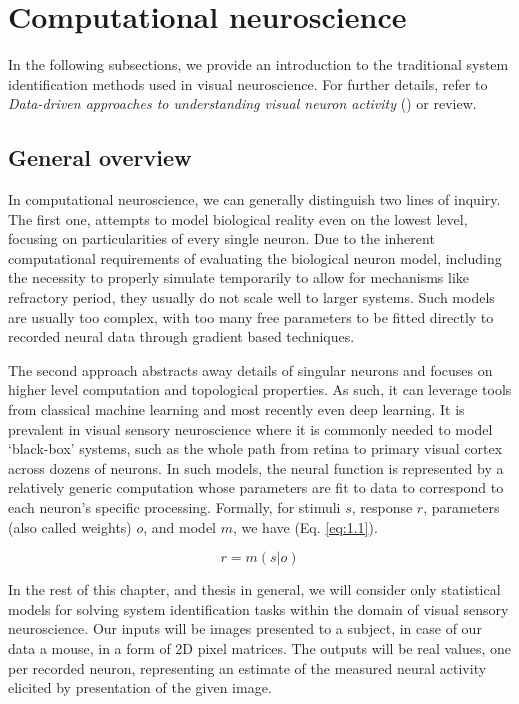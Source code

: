 \section{Computational neuroscience}

In the following subsections, we provide an introduction to the traditional system identification methods used in visual neuroscience. For further details, refer to \textit{Data-driven approaches to understanding visual neuron activity} (\cite{doi:10.1146/annurev-vision-091718-014731}) or \cite{Carandini10577} review.

\subsection{General overview}

In computational neuroscience, we can generally distinguish two lines of inquiry. The first one, attempts to model biological reality even on the lowest level, focusing on particularities of every single neuron. Due to the inherent computational requirements of evaluating the biological neuron model, including the necessity to properly simulate temporarily to allow for mechanisms like refractory period, they usually do not scale well to larger systems. Such models are usually too complex, with too many free parameters to be fitted directly to recorded neural data through gradient based techniques. 

The second approach abstracts away details of singular neurons and focuses on higher level computation and topological properties. As such, it can leverage tools from classical machine learning and most recently even deep learning. It is prevalent in visual sensory neuroscience where it is commonly needed to model ‘black-box’ systems, such as the whole path from retina to primary visual cortex across dozens of neurons. In such models, the neural function is represented by a relatively generic computation whose parameters are fit to data to correspond to each neuron’s specific processing. Formally, for stimuli $s$, response $r$, parameters (also called weights) $o$, and model $m$, we have (Eq. \ref{eq:1.1}).

\begin{equation}\label{eq:1.1}
    r=m(s|o)
\end{equation}

In the rest of this chapter, and thesis in general, we will consider only statistical models for solving system identification tasks within the domain of visual sensory neuroscience. Our inputs will be images presented to a subject, in case of our data a mouse, in a form of 2D pixel matrices. The outputs will be real values, one per recorded neuron, representing an estimate of the measured neural activity elicited by presentation of the given image.

